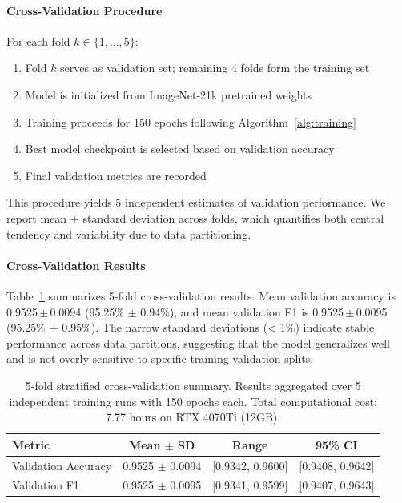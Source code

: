 \documentclass[11pt,a4paper]{article}
\begin{document}
\paragraph{Cross-Validation Procedure}
For each fold \(k \in \{1, \ldots, 5\}\):
\begin{enumerate}[leftmargin=*]
\item Fold \(k\) serves as validation set; remaining 4 folds form the training set
\item Model is initialized from ImageNet-21k pretrained weights
\item Training proceeds for 150 epochs following Algorithm~\ref{alg:training}
\item Best model checkpoint is selected based on validation accuracy
\item Final validation metrics are recorded
\end{enumerate}

This procedure yields 5 independent estimates of validation performance. We report mean \(\pm\) standard deviation across folds, which quantifies both central tendency and variability due to data partitioning.

\paragraph{Cross-Validation Results}
Table~\ref{tab:cv} summarizes 5-fold cross-validation results. Mean validation accuracy is 0.9525\,\(\pm\)\,0.0094 (95.25\% \(\pm\) 0.94\%), and mean validation F1 is 0.9525\,\(\pm\)\,0.0095 (95.25\% \(\pm\) 0.95\%). The narrow standard deviations (< 1\%) indicate stable performance across data partitions, suggesting that the model generalizes well and is not overly sensitive to specific training-validation splits.

\begin{table}[H]
\centering
\caption{5-fold stratified cross-validation summary. Results aggregated over 5 independent training runs with 150 epochs each. Total computational cost: 7.77 hours on RTX 4070Ti (12GB).}
\label{tab:cv}
\begin{tabular}{lccc}
\toprule
Metric & Mean $\pm$ SD & Range & 95\% CI \\
\midrule
Validation Accuracy & 0.9525 $\pm$ 0.0094 & [0.9342, 0.9600] & [0.9408, 0.9642] \\
Validation F1 & 0.9525 $\pm$ 0.0095 & [0.9341, 0.9599] & [0.9407, 0.9643] \\
\bottomrule
\end{tabular}
\end{table}
\end{document}
